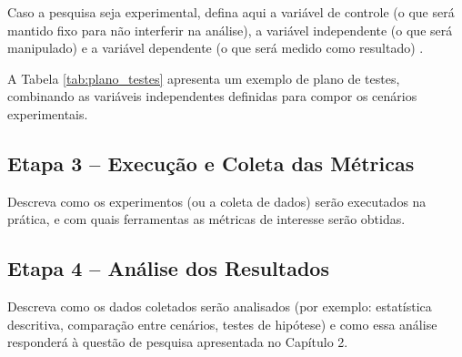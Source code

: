 Caso a pesquisa seja experimental, defina aqui a variável de controle (o que será mantido fixo para não interferir na análise), a variável independente (o que será manipulado) e a variável dependente (o que será medido como resultado) \cite{marconi2017metodologia}.

A Tabela \ref{tab:plano_testes} apresenta um exemplo de plano de testes, combinando as variáveis independentes definidas para compor os cenários experimentais.

\begin{table}[H]
\end{table}

\subsection{Etapa 3 -- Execução e Coleta das Métricas}

Descreva como os experimentos (ou a coleta de dados) serão executados na prática, e com quais ferramentas as métricas de interesse serão obtidas.

\subsection{Etapa 4 -- Análise dos Resultados}

Descreva como os dados coletados serão analisados (por exemplo: estatística descritiva, comparação entre cenários, testes de hipótese) e como essa análise responderá à questão de pesquisa apresentada no Capítulo 2.
